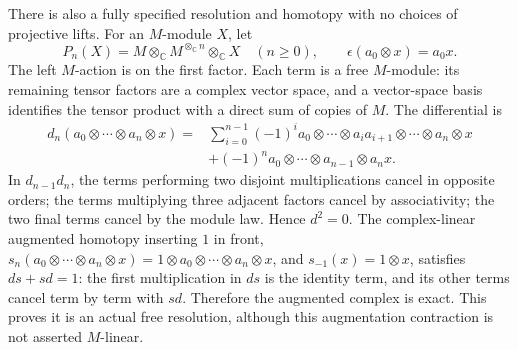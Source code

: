 There is also a fully specified resolution and homotopy with no choices
of projective lifts. For an \(M\)-module \(X\), let \[
P_n(X)=M\otimes_{\mathbb C}M^{\otimes_{\mathbb C}n}\otimes_{\mathbb C}X
\quad(n\ge0),\qquad
\epsilon(a_0\otimes x)=a_0x.
\tag{GMS4.5}
\] The left \(M\)-action is on the first factor. Each term is a free
\(M\)-module: its remaining tensor factors are a complex vector space,
and a vector-space basis identifies the tensor product with a direct sum
of copies of \(M\). The differential is \[
\begin{aligned}
d_n(a_0\otimes\cdots\otimes a_n\otimes x)
={}&\sum_{i=0}^{n-1}(-1)^i
a_0\otimes\cdots\otimes a_i a_{i+1}\otimes\cdots\otimes a_n\otimes x\\
&+(-1)^n a_0\otimes\cdots\otimes a_{n-1}\otimes a_nx.
\end{aligned}
\tag{GMS4.6}
\] In \(d_{n-1}d_n\), the terms performing two disjoint multiplications
cancel in opposite orders; the terms multiplying three adjacent factors
cancel by associativity; the two final terms cancel by the module law.
Hence \(d^2=0\). The complex-linear augmented homotopy inserting \(1\)
in front,
\(s_n(a_0\otimes\cdots\otimes a_n\otimes x)=1\otimes a_0\otimes\cdots\otimes a_n\otimes x\),
and \(s_{-1}(x)=1\otimes x\), satisfies \(ds+sd=1\): the first
multiplication in \(d s\) is the identity term, and its other terms
cancel term by term with \(s d\). Therefore the augmented complex is
exact. This proves it is an actual free resolution, although this
augmentation contraction is not asserted \(M\)-linear.

